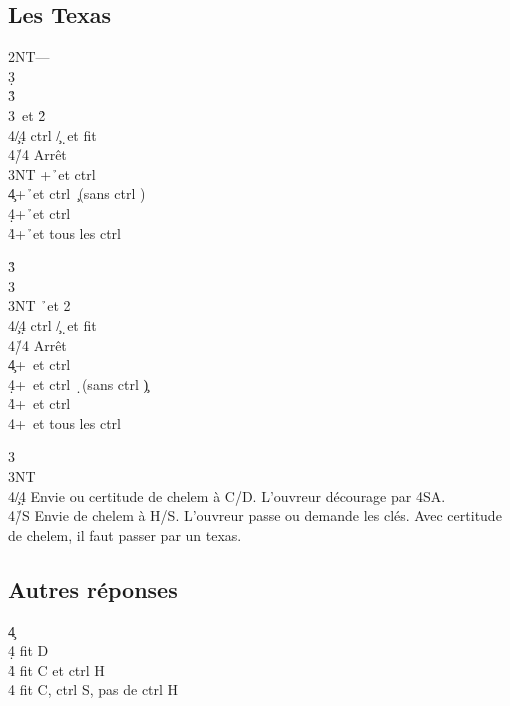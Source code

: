 \documentclass[a4paper]{article}
\begin{document}
\subsection{Les Texas}

\begin{bidtable}
2NT---\\
3\d\+\\
3\h {}\h \\
3\s {}\s\ et 2\h \+\\
4\c/4\d \> ctrl \c /\d\ et fit \s \\
4\h/4\s \> Arrêt\-\\
3NT +\h\ et ctrl \s \\
4\c {}+\h\ et ctrl \c\ (sans ctrl \s )\\
4\d {}+\h\ et ctrl \d \\
4\h {}+\h\ et tous les ctrl\-
\end{bidtable}

\begin{bidtable}
3\h\+\\
3\s {}\s \\
3NT \h\ et 2\s \+\\
4\c/4\d \> ctrl \c /\d\ et fit \h \\
4\h/4\s \> Arrêt\-\\
4\c {}+\s\ et ctrl \c \\
4\d {}+\s\ et ctrl \d\ (sans ctrl \c )\\
4\h {}+\s\ et ctrl \h \\
4\s {}+\s\ et tous les ctrl\-
\end{bidtable}

\begin{bidtable}
3\s\+\\
3NT\+\\
4\c/4\d \> Envie ou certitude de chelem à C/D. L'ouvreur décourage par 4SA.\\
4\h/S \> Envie de chelem à H/S. L'ouvreur passe ou demande les clés. Avec certitude de chelem, il faut passer par un texas.\-\-
\end{bidtable}

\subsection{Autres réponses}

\begin{bidtable}
4\c\+\\
4\d \> fit D\\
4\h \> fit C et ctrl H\\
4\s \> fit C, ctrl S, pas de ctrl H\-
\end{bidtable}
\end{document}
